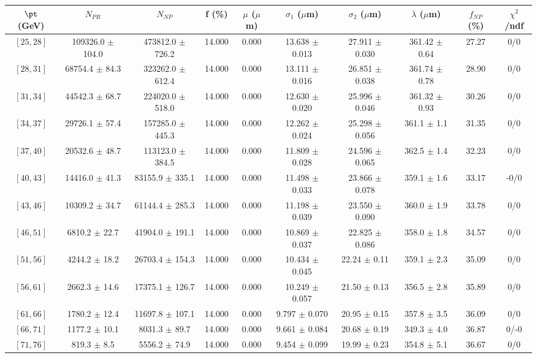 \begin{tabular}{c||c|c|c|c|c|c|c||c|c}
$\pt$ (GeV) & $N_{PR}$ & $N_{NP}$ & f (\%) & $\mu$ ($\mu$m) & $\sigma_1$ ($\mu$m) & $\sigma_2$ ($\mu$m)  & $\lambda$ ($\mu$m) & $f_{NP}$ (\%) & $\chi^2$/ndf \\
\hline
$[25, 28]$ & 109326.0 $\pm$ 104.0 & 473812.0 $\pm$ 726.2 & 14.000 & 0.000 & 13.638 $\pm$ 0.013 & 27.911 $\pm$ 0.030 & 361.42 $\pm$ 0.64 & 27.27 & 0/0\\
$[28, 31]$ & 68754.4 $\pm$ 84.3 & 323262.0 $\pm$ 612.4 & 14.000 & 0.000 & 13.111 $\pm$ 0.016 & 26.851 $\pm$ 0.038 & 361.74 $\pm$ 0.78 & 28.90 & 0/0\\
$[31, 34]$ & 44542.3 $\pm$ 68.7 & 224020.0 $\pm$ 518.0 & 14.000 & 0.000 & 12.630 $\pm$ 0.020 & 25.996 $\pm$ 0.046 & 361.32 $\pm$ 0.93 & 30.26 & 0/0\\
$[34, 37]$ & 29726.1 $\pm$ 57.4 & 157285.0 $\pm$ 445.3 & 14.000 & 0.000 & 12.262 $\pm$ 0.024 & 25.298 $\pm$ 0.056 & 361.1 $\pm$ 1.1 & 31.35 & 0/0\\
$[37, 40]$ & 20532.6 $\pm$ 48.7 & 113123.0 $\pm$ 384.5 & 14.000 & 0.000 & 11.809 $\pm$ 0.028 & 24.596 $\pm$ 0.065 & 362.5 $\pm$ 1.4 & 32.23 & 0/0\\
$[40, 43]$ & 14416.0 $\pm$ 41.3 & 83155.9 $\pm$ 335.1 & 14.000 & 0.000 & 11.498 $\pm$ 0.033 & 23.866 $\pm$ 0.078 & 359.1 $\pm$ 1.6 & 33.17 & -0/0\\
$[43, 46]$ & 10309.2 $\pm$ 34.7 & 61144.4 $\pm$ 285.3 & 14.000 & 0.000 & 11.198 $\pm$ 0.039 & 23.550 $\pm$ 0.090 & 360.0 $\pm$ 1.9 & 33.78 & 0/0\\
$[46, 51]$ & 6810.2 $\pm$ 22.7 & 41904.0 $\pm$ 191.1 & 14.000 & 0.000 & 10.869 $\pm$ 0.037 & 22.825 $\pm$ 0.086 & 358.0 $\pm$ 1.8 & 34.57 & 0/0\\
$[51, 56]$ & 4244.2 $\pm$ 18.2 & 26703.4 $\pm$ 154.3 & 14.000 & 0.000 & 10.434 $\pm$ 0.045 & 22.24 $\pm$ 0.11 & 359.1 $\pm$ 2.3 & 35.09 & 0/0\\
$[56, 61]$ & 2662.3 $\pm$ 14.6 & 17375.1 $\pm$ 126.7 & 14.000 & 0.000 & 10.249 $\pm$ 0.057 & 21.50 $\pm$ 0.13 & 356.5 $\pm$ 2.8 & 35.89 & 0/0\\
$[61, 66]$ & 1780.2 $\pm$ 12.4 & 11697.8 $\pm$ 107.1 & 14.000 & 0.000 & 9.797 $\pm$ 0.070 & 20.95 $\pm$ 0.15 & 357.8 $\pm$ 3.5 & 36.09 & 0/0\\
$[66, 71]$ & 1177.2 $\pm$ 10.1 & 8031.3 $\pm$ 89.7 & 14.000 & 0.000 & 9.661 $\pm$ 0.084 & 20.68 $\pm$ 0.19 & 349.3 $\pm$ 4.0 & 36.87 & 0/-0\\
$[71, 76]$ & 819.3 $\pm$ 8.5 & 5556.2 $\pm$ 74.9 & 14.000 & 0.000 & 9.454 $\pm$ 0.099 & 19.99 $\pm$ 0.23 & 354.8 $\pm$ 5.1 & 36.67 & 0/0\\

\end{tabular}
